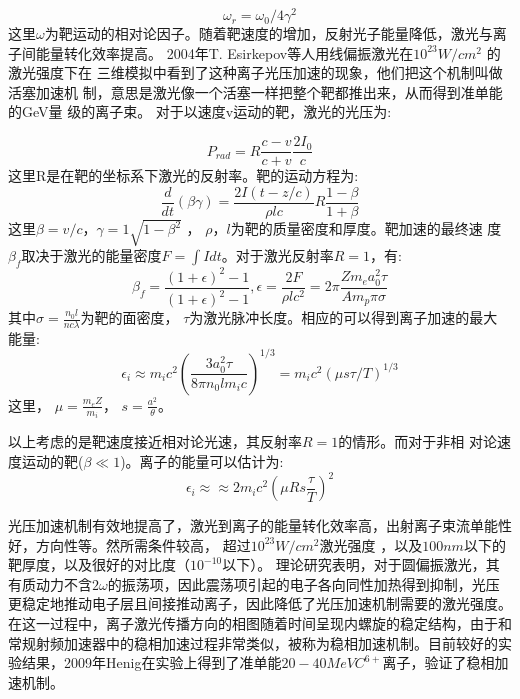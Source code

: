\begin{equation}
\label{eqn:doplor}
\omega_r = \omega_0/ 4{\gamma}^2
\end{equation}
这里$\omega$为靶运动的相对论因子。随着靶速度的增加，反射光子能量降低，激光与离子间能量转化效率提高。
2004年T. Esirkepov等人\cite{esirkepov2004highly}用线偏振激光在$10^{23} W/cm^2$ 的激光强度下在
三维模拟中看到了这种离子光压加速的现象，他们把这个机制叫做活塞加速机
制，意思是激光像一个活塞一样把整个靶都推出来，从而得到准单能的GeV量
级的离子束。 对于以速度v运动的靶，激光的光压为:

\begin{equation}
\label{eqn:piston}
P_{rad}=R\frac{c-v}{c+v} \frac{2I_0}{c}
\end{equation}这里R是在靶的坐标系下激光的反射率。靶的运动方程为:
\begin{equation}
\label{eqn:targetMove}
\frac{d}{dt}(\beta \gamma) =\frac{2I(t-z/c)}{\rho lc} R \frac{1-\beta}{1+\beta}
\end{equation}
这里$\beta=v/c$，$\gamma=1 \sqrt{1-{\beta}^2}$ ， $\rho$，$l$为靶的质量密度和厚度。靶加速的最终速
度$\beta_f$取决于激光的能量密度$F=\int{I dt}$。对于激光反射率$R = 1$，有:
\begin{equation}
\label{eqn:reflectionIndex}
\beta_f=\frac{(1+\epsilon)^2-1}{(1+\epsilon)^2-1}, \epsilon=\frac{2F}{\rho l c^2} =2\pi \frac{Zm_e a^2_0 \tau}{A m_p \pi \sigma}
\end{equation}
其中$\sigma= \frac{n_0l}{nc \lambda}$为靶的面密度，
$\tau$为激光脉冲长度。相应的可以得到离子加速的最大
能量:
\begin{equation}
\label{eqn:ionMaxenergy}
\epsilon_i \approx m_i c^2(\frac{3a_0^2 \tau}{8 \pi n_0 l m_i 
c})^{1/3}=m_i c^2(\mu s \tau/T)^{1/3}
\end{equation}
这里， $\mu=\frac{m_e Z}{m_i}$， $s=\frac{a^2}{\theta}$。


以上考虑的是靶速度接近相对论光速，其反射率$R=1$的情形。而对于非相
对论速度运动的靶($\beta \ll 1$)。离子的能量可以估计为:
\begin{equation}
\label{eqn:ionMaxenergyapprox}
\epsilon_i \approx \approx 2 m_i c^2(\mu R s \frac{\tau}{T})^{2}
\end{equation}

光压加速机制有效地提高了，激光到离子的能量转化效率高，出射离子束流单能性好，方向性等。然所需条件较高， 超过$10^{23} W/cm^2$激光强度 ，以及$100 nm$以下的靶厚度，以及很好的对比度（$10^{-10}$以下）。
理论研究表明，对于圆偏振激光，其有质动力不含$2\omega$的振荡项，因此震荡项引起的电子各向同性加热得到抑制，光压更稳定地推动电子层且间接推动离子，因此降低了光压加速机制需要的激光强度\cite{yan2008generating,qiao2009stable,robinson2008radiation,klimo2008monoenergetic}。在这一过程中，离子激光传播方向的相图随着时间呈现内螺旋的稳定结构，由于和常规射频加速器中的稳相加速过程非常类似，被称为稳相加速机制\cite{yan2008generating}。目前较好的实验结果，2009年Henig\cite{henig2009radiation}在实验上得到了准单能$20-40MeV C^{6+}$离子，验证了稳相加速机制。

